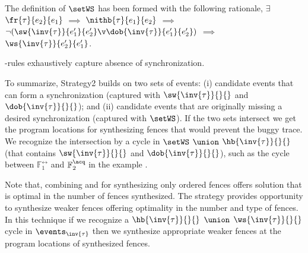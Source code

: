 \noindent
The definition of $\setWS$ has been formed with the following rationale,
	$\exists$ $\fr{\tau}{e_2}{e_1}$ $\implies$
	$\nithb{\tau}{e_1}{e_2}$ $\implies$
	$\neg(\sw{\inv{\tau}}{e_1'}{e_2'} \v \dob{\inv{\tau}}{e_1'}{e_2'})$ 
	$\implies$ $\ws{\inv{\tau}}{e_2'}{e_1'}$.

\begin{theorem} \label{thm:ws exhaustive}
	\lws-rules exhaustively capture absence of synchronization.
\end{theorem}

To summarize, Strategy2 builds on two sets of events:
(i) candidate events that can form a synchronization 
(captured with $\sw{\inv{\tau}}{}{}$ and 
$\dob{\inv{\tau}}{}{}$); and
(ii) candidate events that are originally missing a desired
synchronization (captured with $\setWS$).
If the two sets intersect we get the program locations
for synthesizing fences that would prevent the buggy trace.
We recognize the intersection by a cycle in  
$\setWS$ $\union$ $\hb{\inv{\tau}}{}{}$ 
(that contains $\sw{\inv{\tau}}{}{}$ and $\dob{\inv{\tau}}{}{}$), 
such as the cycle between $\mathbb{F}^\rel_1$ and 
$\mathbb{F}^\acq_2$ in the example .

Note that, combining \stfence and \wkfence for synthesizing only
\sc ordered fences offers solution that is optimal in the number
of fences synthesized. 
%
The \wkfence strategy provides opportunity to synthesize weaker
fences offering optimality in the number and type of fences.
%
In this technique if we recognize a $\hb{\inv{\tau}}{}{}$ $\union$ 
$\ws{\inv{\tau}}{}{}$ cycle in $\events_{\inv{\tau}}$ then we
synthesize appropriate weaker fences at the program locations  
of synthesized fences.
